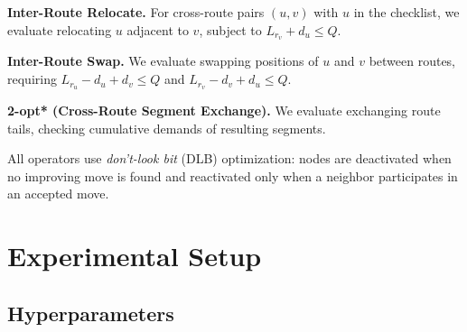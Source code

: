 \documentclass[sigconf]{acmart}
\begin{document}
\textbf{Inter-Route Relocate.}
For cross-route pairs $(u, v)$ with $u$ in the checklist, we evaluate relocating $u$ adjacent to $v$, subject to $L_{r_v} + d_u \leq Q$.

\textbf{Inter-Route Swap.}
We evaluate swapping positions of $u$ and $v$ between routes, requiring $L_{r_u} - d_u + d_v \leq Q$ and $L_{r_v} - d_v + d_u \leq Q$.

\textbf{2-opt* (Cross-Route Segment Exchange).}
We evaluate exchanging route tails, checking cumulative demands of resulting segments.

All operators use \emph{don't-look bit} (DLB) optimization: nodes are deactivated when no improving move is found and reactivated only when a neighbor participates in an accepted move.

\section{Experimental Setup}
\label{app:setup}

\subsection{Hyperparameters}
\label{app:repro}
\end{document}

